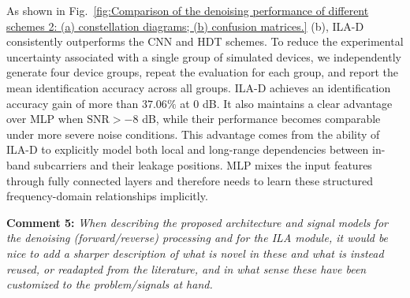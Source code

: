 \documentclass[onecolumn,11pt]{article}
\newcommand{\secc}[2]{\mySep \noindent \textsf{\textbf{#1 }}\noindent \textit{#2}}
\newcommand{\mySep}{\vspace{8pt}}
\begin{document}
{{As shown in Fig.~\ref{fig:Comparison of the denoising performance of different schemes 2: (a) constellation diagrams; (b) confusion matrices.} (b), ILA-D consistently outperforms the CNN and HDT schemes. To reduce the experimental uncertainty associated with a single group of simulated devices, we independently generate four device groups, repeat the evaluation for each group, and report the mean identification accuracy across all groups. ILA-D achieves an identification accuracy gain of more than $37.06\%$ at 0 dB. It also maintains a clear advantage over MLP when $\mathrm{SNR}>-8$ dB, while their performance becomes comparable under more severe noise conditions. This advantage comes from the ability of ILA-D to explicitly model both local and long-range dependencies between in-band subcarriers and their leakage positions. MLP mixes the input features through fully connected layers and therefore needs to learn these structured frequency-domain relationships implicitly.
}


}

\secc{Comment 5:}{When describing the proposed architecture and signal models for the denoising (forward/reverse) processing and for the ILA module, it would be nice to add a sharper description of what is novel in these and what is instead reused, or readapted from the literature, and in what sense these have been customized to the problem/signals at hand.
}
\end{document}

